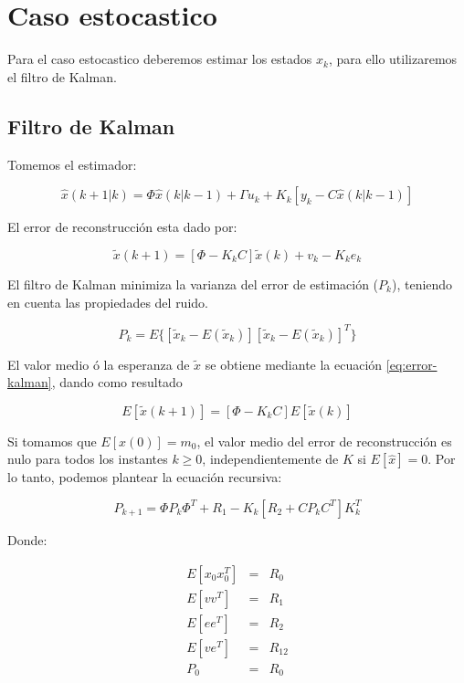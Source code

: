 \section{Caso estocastico}

Para el caso estocastico deberemos estimar los estados $x_k$, para ello utilizaremos el filtro de Kalman.

\subsection{Filtro de Kalman}

Tomemos el estimador: 

\begin{equation}
    \hat{x}(k+1|k) =
    \Phi\hat{x}(k|k-1)+\Gamma u_k + K_k [y_k-C\hat{x}(k|k-1)]
\end{equation}

El error de reconstrucción esta dado por: 

\begin{equation}
    \label{eq:error-kalman}
    \tilde{x}(k+1)=[\Phi-K_kC]\tilde{x}(k)+v_k - K_ke_k
\end{equation}

El filtro de Kalman minimiza la varianza del error de estimación ($P_k$), teniendo 
en cuenta las propiedades del ruido.

\begin{equation}
    P_k=E\{[\tilde{x}_k - E(\tilde{x}_k)][\tilde{x}_k - E(\tilde{x}_k)]^T\}
\end{equation}

El valor medio ó la esperanza de $\tilde{x}$ se obtiene mediante la ecuación \ref{eq:error-kalman}, dando como resultado

\begin{equation}
    E[\tilde{x}(k+1)]=[\Phi-K_kC]E[\tilde{x}(k)]
\end{equation}

Si tomamos que $E[x(0)]=m_0$, el valor medio del error
de reconstrucción es nulo para todos los instantes $k\geq 0$,
independientemente de $K$ si $E[\hat{x}]=0$. Por lo tanto, podemos 
plantear la ecuación recursiva: 

\begin{equation}
    P_{k+1}=
    \Phi P_k\Phi^T 
    + R_1
    - K_k[R_2+CP_kC^T]K_k^T
\end{equation}

Donde:

\begin{equation}
    \begin{array}{ccc}
        E[x_0x_0^T] & = & R_0 \\
        E[vv^T] & = & R_1 \\ 
        E[ee^T] & = & R_2 \\ 
        E[ve^T] & = & R_{12} \\ 
        P_0 & = & R_0
    \end{array} 
\end{equation}

